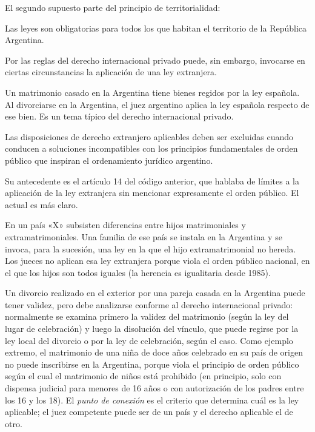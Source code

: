 \documentclass[12pt,oneside]{book}
\begin{document}
El segundo supuesto parte del principio de territorialidad:

\begin{regla}
Las leyes son obligatorias para todos los que habitan el territorio de la República Argentina.
\end{regla}

Por las reglas del derecho internacional privado puede, sin embargo, invocarse en ciertas circunstancias la aplicación de una ley extranjera.

\begin{ejemplo}
Un matrimonio casado en la Argentina tiene bienes regidos por la ley española. Al divorciarse en la Argentina, el juez argentino aplica la ley española respecto de ese bien. Es un tema típico del derecho internacional privado.
\end{ejemplo}

\begin{regla}
Las disposiciones de derecho extranjero aplicables deben ser excluidas cuando conducen a soluciones incompatibles con los principios fundamentales de orden público que inspiran el ordenamiento jurídico argentino.
\end{regla}

Su antecedente es el artículo 14 del código anterior, que hablaba de límites a la aplicación de la ley extranjera sin mencionar expresamente el orden público. El actual es más claro.

\begin{ejemplo}
En un país «X» subsisten diferencias entre hijos matrimoniales y extramatrimoniales. Una familia de ese país se instala en la Argentina y se invoca, para la sucesión, una ley en la que el hijo extramatrimonial no hereda. Los jueces no aplican esa ley extranjera porque viola el orden público nacional, en el que los hijos son todos iguales (la herencia es igualitaria desde 1985).
\end{ejemplo}

\begin{nota}
Un divorcio realizado en el exterior por una pareja casada en la Argentina puede tener validez, pero debe analizarse conforme al derecho internacional privado: normalmente se examina primero la validez del matrimonio (según la ley del lugar de celebración) y luego la disolución del vínculo, que puede regirse por la ley local del divorcio o por la ley de celebración, según el caso. Como ejemplo extremo, el matrimonio de una niña de doce años celebrado en su país de origen no puede inscribirse en la Argentina, porque viola el principio de orden público según el cual el matrimonio de niños está prohibido (en principio, solo con dispensa judicial para menores de 16 años o con autorización de los padres entre los 16 y los 18). El \textit{punto de conexión} es el criterio que determina cuál es la ley aplicable; el juez competente puede ser de un país y el derecho aplicable el de otro.
\end{nota}
\end{document}
